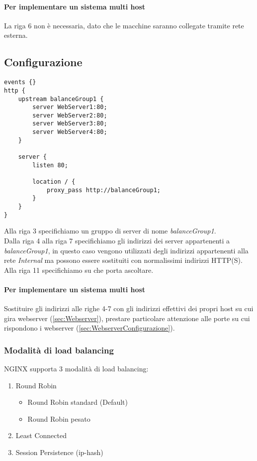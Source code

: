 \documentclass[../DocumentazioneProgetto.tex]{subfiles}
\begin{document}
	\paragraph{Per implementare un sistema multi host} 
	La riga 6 non è necessaria, dato che le macchine saranno collegate tramite rete esterna.
	\subsection{Configurazione} 
	\begin{lstlisting}[caption=File di configurazione Load Balancer NGINX] 
events {}
http {
	upstream balanceGroup1 {
		server WebServer1:80;
		server WebServer2:80;
		server WebServer3:80;
		server WebServer4:80;
	}

	server {
		listen 80;
		
		location / {
			proxy_pass http://balanceGroup1;
		}
	}
}\end{lstlisting}
	Alla riga 3 specifichiamo un gruppo di server di nome \textit{balanceGroup1}.\\
	Dalla riga 4 alla riga 7 specifichiamo gli indirizzi dei server appartenenti a \textit{balanceGroup1}, in questo caso vengono
	utilizzati degli indirizzi appartenenti alla rete \textit{Internal} ma possono essere sostituiti con normalissimi indirizzi HTTP(S).\\
	Alla riga 11 specifichiamo su che porta ascoltare.
	\paragraph{Per implementare un sistema multi host} Sostituire gli indirizzi alle righe 4-7 con gli indirizzi effettivi dei propri host su cui gira webserver (\autoref{sec:Webserver}), prestare particolare attenzione alle porte su cui rispondono i webserver (\autoref{sec:WebserverConfigurazione}).
	\subsubsection{Modalità di load balancing} 
	NGINX supporta 3 modalità di load balancing:
	\begin{enumerate}
		\item Round Robin
		\begin{itemize}
			\item Round Robin standard (Default)
			\item Round Robin pesato
		\end{itemize}
		\item Least Connected
		\item Session Persistence (ip-hash)
	\end{enumerate}
\end{document}
